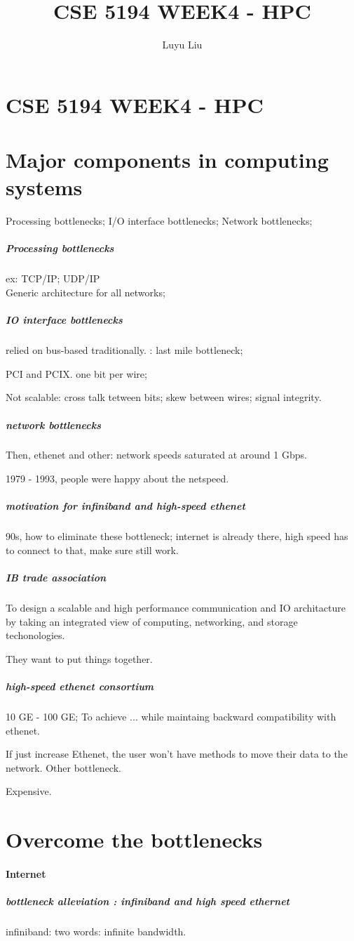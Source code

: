 \documentclass[12pt]{article}
\begin{document}
\author{Luyu Liu}

\newcommand\para{\par\refstepcounter{para}\thepara\space}

\section*{CSE 5194 WEEK4 - HPC}
\title{CSE 5194 WEEK4 - HPC}
\section{Major components in computing systems}
Processing bottlenecks; I/O interface bottlenecks; Network bottlenecks;
\subparagraph{Processing bottlenecks}
ex: TCP/IP; UDP/IP
\\ Generic architecture for all networks;
\subparagraph{IO interface bottlenecks}
relied on bus-based traditionally. : last mile bottleneck;

PCI and PCIX.
one bit per wire;

Not scalable: cross talk tetween bits; skew between wires; signal integrity.

\subparagraph{network bottlenecks}
Then, ethenet and other: network speeds saturated at around 1 Gbps.

1979 - 1993, people were happy about the netspeed.

\subparagraph{motivation for infiniband and high-speed ethenet}
90s, how to eliminate these bottleneck;
internet is already there, high speed has to connect to that, make sure still work.

\subparagraph{IB trade association}
To design a scalable and high performance communication and IO architacture by taking an integrated view of computing, networking, and storage techonologies.

They want to put things together.

\subparagraph{high-speed ethenet consortium}
10 GE - 100 GE;
To achieve ... while maintaing backward compatibility with ethenet.

If just increase Ethenet, the user won't have methods to move their data to the network. Other bottleneck.

Expensive.


\section{Overcome the bottlenecks}
\paragraph{Internet}
\subparagraph{bottleneck alleviation : infiniband and high speed ethernet}
infiniband: two words: infinite bandwidth.
\end{document}
